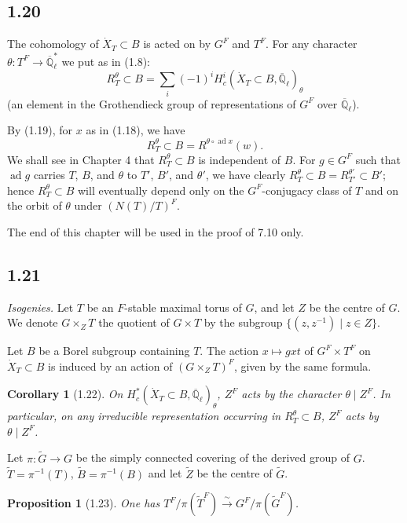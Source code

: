 \documentclass[11pt]{amsart}
\theoremstyle{plain}
\newtheorem{proposition}[theorem]{Proposition}
\newtheorem{corollary}[theorem]{Corollary}
\theoremstyle{remark}
\DeclareMathOperator{\ad}{ad}
\begin{document}
\subsection{1.20} The cohomology of $\dot{X}_T \subset B$ is acted on by $G^F$ and $T^F$. For any character $\theta: T^F \to \overline{\mathbb{Q}}_\ell^*$ we put as in (1.8):
\[
R_T^\theta \subset B = \sum_i (-1)^i H_c^i(\dot{X}_T \subset B, \overline{\mathbb{Q}}_\ell)_\theta
\]
(an element in the Grothendieck group of representations of $G^F$ over $\overline{\mathbb{Q}}_\ell$).

By (1.19), for $x$ as in (1.18), we have
\[
R_T^\theta \subset B = R^{\theta \circ \ad x}(w).
\]
We shall see in Chapter 4 that $R_T^\theta \subset B$ is independent of $B$. For $g \in G^F$ such that $\ad g$ carries $T$, $B$, and $\theta$ to $T'$, $B'$, and $\theta'$, we have clearly $R_T^\theta \subset B = R_{T'}^{\theta'} \subset B'$; hence $R_T^\theta \subset B$ will eventually depend only on the $G^F$-conjugacy class of $T$ and on the orbit of $\theta$ under $(N(T)/T)^F$.

The end of this chapter will be used in the proof of 7.10 only.

\subsection{1.21} \textit{Isogenies.} Let $T$ be an $F$-stable maximal torus of $G$, and let $Z$ be the centre of $G$. We denote $G \times_Z T$ the quotient of $G \times T$ by the subgroup $\{(z, z^{-1}) \mid z \in Z\}$.

Let $B$ be a Borel subgroup containing $T$. The action $x \mapsto gxt$ of $G^F \times T^F$ on $\dot{X}_T \subset B$ is induced by an action of $(G \times_Z T)^F$, given by the same formula.

\begin{corollary}[1.22]
On $H_c^*(\dot{X}_T \subset B, \overline{\mathbb{Q}}_\ell)_\theta$, $Z^F$ acts by the character $\theta \mid Z^F$. In particular, on any irreducible representation occurring in $R_T^\theta \subset B$, $Z^F$ acts by $\theta \mid Z^F$.
\end{corollary}

Let $\pi: \tilde{G} \to G$ be the simply connected covering of the derived group of $G$. $\tilde{T} = \pi^{-1}(T)$, $\tilde{B} = \pi^{-1}(B)$ and let $\tilde{Z}$ be the centre of $\tilde{G}$.

\begin{proposition}[1.23]
One has $T^F/\pi(\tilde{T}^F) \xrightarrow{\sim} G^F/\pi(\tilde{G}^F)$.
\end{proposition}
\end{document}
